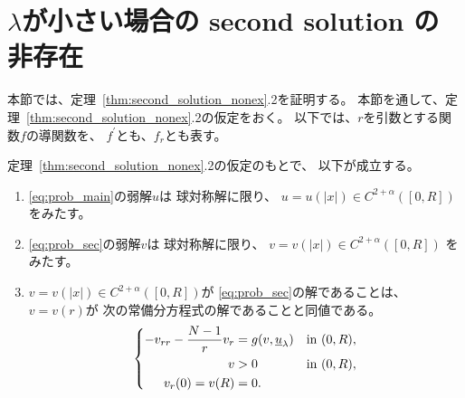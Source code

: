 \section{$\lambda$が小さい場合の second solution の非存在}
\label{sec:sym}

本節では、定理~\ref{thm:second_solution_nonex}.2を証明する。
本節を通して、定理~\ref{thm:second_solution_nonex}.2の仮定をおく。
以下では、$r$を引数とする関数$f$の導関数を、
$f^\prime$とも、$f_r$とも表す。

\begin{lem}
 定理~\ref{thm:second_solution_nonex}.2の仮定のもとで、
 以下が成立する。
 \begin{enumerate}[1.] \sage
  \item \ref{eq:prob_main}の弱解$u$は
        球対称解に限り、
        $u = u(\lvert x \rvert)
        \in C^{2+\alpha}([0, R])$
        をみたす。
  \item \ref{eq:prob_sec}の弱解$v$は
        球対称解に限り、
        $v = v(\lvert x \rvert)
        \in C^{2+\alpha}([0, R])$
        をみたす。
  \item $v = v(\lvert x \rvert) \in C^{2+\alpha}([0, R])$が
        \ref{eq:prob_sec}の解であることは、
        $v = v(r)$が
        次の常備分方程式の解であることと同値である。
        \begin{align}
         \left\{
          \begin{aligned}
           -v_{rr} - \frac{N-1}{r}v_r  &= g(v, \underline{u}_\lambda)
           & &\text{in}~ (0, R),  \\
           v &> 0 & &\text{in}~ (0, R), \\
           v_r(0) = v(R) &= 0.  & &
          \end{aligned}
         \right. \label{eq:prob_rad}
        \end{align}
 \end{enumerate}
\end{lem}


